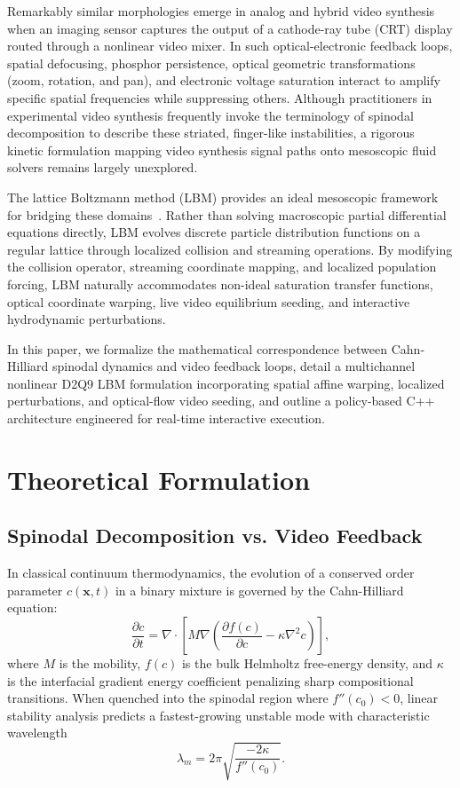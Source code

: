 \documentclass[aps,pre,twocolumn,showpacs,superscriptaddress,floatfix]{revtex4-2}
\begin{document}
Remarkably similar morphologies emerge in analog and hybrid video synthesis when an imaging sensor captures the output of a cathode-ray tube (CRT) display routed through a nonlinear video mixer. In such optical-electronic feedback loops, spatial defocusing, phosphor persistence, optical geometric transformations (zoom, rotation, and pan), and electronic voltage saturation interact to amplify specific spatial frequencies while suppressing others. Although practitioners in experimental video synthesis frequently invoke the terminology of spinodal decomposition to describe these striated, finger-like instabilities, a rigorous kinetic formulation mapping video synthesis signal paths onto mesoscopic fluid solvers remains largely unexplored.

The lattice Boltzmann method (LBM) provides an ideal mesoscopic framework for bridging these domains~\cite{succi2001,kruger2017}. Rather than solving macroscopic partial differential equations directly, LBM evolves discrete particle distribution functions on a regular lattice through localized collision and streaming operations. By modifying the collision operator, streaming coordinate mapping, and localized population forcing, LBM naturally accommodates non-ideal saturation transfer functions, optical coordinate warping, live video equilibrium seeding, and interactive hydrodynamic perturbations.

In this paper, we formalize the mathematical correspondence between Cahn-Hilliard spinodal dynamics and video feedback loops, detail a multichannel nonlinear D2Q9 LBM formulation incorporating spatial affine warping, localized perturbations, and optical-flow video seeding, and outline a policy-based C++ architecture engineered for real-time interactive execution.

\section{Theoretical Formulation}

\subsection{Spinodal Decomposition vs. Video Feedback}

In classical continuum thermodynamics, the evolution of a conserved order parameter $c(\bm{x}, t)$ in a binary mixture is governed by the Cahn-Hilliard equation:
\begin{equation}
\frac{\partial c}{\partial t} = \nabla \cdot \left[ M \nabla \left( \frac{\partial f(c)}{\partial c} - \kappa \nabla^2 c \right) \right],
\label{eq:cahn_hilliard}
\end{equation}
where $M$ is the mobility, $f(c)$ is the bulk Helmholtz free-energy density, and $\kappa$ is the interfacial gradient energy coefficient penalizing sharp compositional transitions. When quenched into the spinodal region where $f''(c_0) < 0$, linear stability analysis predicts a fastest-growing unstable mode with characteristic wavelength
\begin{equation}
\lambda_m = 2\pi \sqrt{\frac{-2\kappa}{f''(c_0)}}.
\label{eq:wavelength}
\end{equation}
\end{document}
